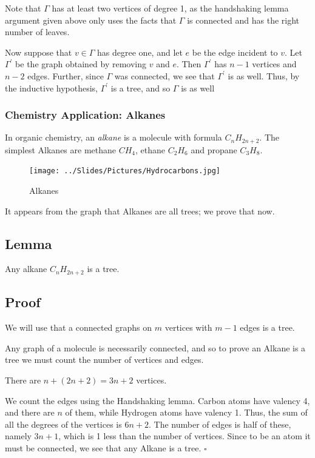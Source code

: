 \documentclass[]{article}
\begin{document}
Note that \(\Gamma\) has at least two vertices of degree 1, as the
handshaking lemma argument given above only uses the facts that
\(\Gamma\) is connected and has the right number of leaves.

Now suppose that \(v\in \Gamma\) has degree one, and let \(e\) be the
edge incident to \(v\). Let \(\Gamma^\prime\) be the graph obtained by
removing \(v\) and \(e\). Then \(\Gamma^\prime\) has \(n-1\) vertices
and \(n-2\) edges. Further, since \(\Gamma\) was connected, we see that
\(\Gamma^\prime\) is as well. Thus, by the inductive hypothesis,
\(\Gamma^\prime\) is a tree, and so \(\Gamma\) is as well

\subsubsection{Chemistry Application:
Alkanes}\label{chemistry-application-alkanes}

In organic chemistry, an \emph{alkane} is a molecule with formula
\(C_nH_{2n+2}\). The simplest Alkanes are methane \(CH_4\), ethane
\(C_2H_6\) and propane \(C_3H_8\).

\begin{figure}[htbp]
\centering
\texttt{[image: ../Slides/Pictures/Hydrocarbons.jpg]}
\caption{Alkanes}
\end{figure}

It appears from the graph that Alkanes are all trees; we prove that now.

\subsection{Lemma}\label{lemma-5}

Any alkane \(C_nH_{2n+2}\) is a tree.

\subsection{Proof}\label{proof-8}

We will use that a connected graphs on \(m\) vertices with \(m-1\) edges
is a tree.

Any graph of a molecule is necessarily connected, and so to prove an
Alkane is a tree we must count the number of vertices and edges.

There are \(n+(2n+2)=3n+2\) vertices.

We count the edges using the Handshaking lemma. Carbon atoms have
valency 4, and there are \(n\) of them, while Hydrogen atoms have
valency 1. Thus, the sum of all the degrees of the vertices is \(6n+2\).
The number of edges is half of these, namely \(3n+1\), which is 1 less
than the number of vertices. Since to be an atom it must be connected,
we see that any Alkane is a tree. \(\square\)
\end{document}
